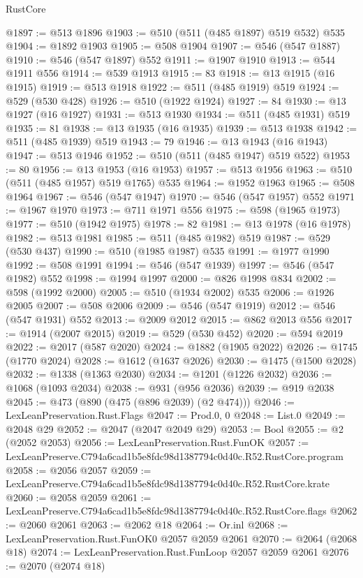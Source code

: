 \begin{lexlean}{RustCore}
\begin{coremodule}
@1897 := @513 @1896
@1903 := @510 (@511 (@485 @1897) @519 @532) @535
@1904 := @1892 @1903
@1905 := @508 @1904
@1907 := @546 (@547 @1887)
@1910 := @546 (@547 @1897) @552
@1911 := @1907 @1910
@1913 := @544 @1911 @556
@1914 := @539 @1913
@1915 := 83
@1918 := @13 @1915 (@16 @1915)
@1919 := @513 @1918
@1922 := @511 (@485 @1919) @519
@1924 := @529 (@530 @428)
@1926 := @510 (@1922 @1924)
@1927 := 84
@1930 := @13 @1927 (@16 @1927)
@1931 := @513 @1930
@1934 := @511 (@485 @1931) @519
@1935 := 81
@1938 := @13 @1935 (@16 @1935)
@1939 := @513 @1938
@1942 := @511 (@485 @1939) @519
@1943 := 79
@1946 := @13 @1943 (@16 @1943)
@1947 := @513 @1946
@1952 := @510 (@511 (@485 @1947) @519 @522)
@1953 := 80
@1956 := @13 @1953 (@16 @1953)
@1957 := @513 @1956
@1963 := @510 (@511 (@485 @1957) @519 @1765) @535
@1964 := @1952 @1963
@1965 := @508 @1964
@1967 := @546 (@547 @1947)
@1970 := @546 (@547 @1957) @552
@1971 := @1967 @1970
@1973 := @711 @1971 @556
@1975 := @598 (@1965 @1973)
@1977 := @510 (@1942 @1975)
@1978 := 82
@1981 := @13 @1978 (@16 @1978)
@1982 := @513 @1981
@1985 := @511 (@485 @1982) @519
@1987 := @529 (@530 @437)
@1990 := @510 (@1985 @1987) @535
@1991 := @1977 @1990
@1992 := @508 @1991
@1994 := @546 (@547 @1939)
@1997 := @546 (@547 @1982) @552
@1998 := @1994 @1997
@2000 := @826 @1998 @834
@2002 := @598 (@1992 @2000)
@2005 := @510 (@1934 @2002) @535
@2006 := @1926 @2005
@2007 := @508 @2006
@2009 := @546 (@547 @1919)
@2012 := @546 (@547 @1931) @552
@2013 := @2009 @2012
@2015 := @862 @2013 @556
@2017 := @1914 (@2007 @2015)
@2019 := @529 (@530 @452)
@2020 := @594 @2019
@2022 := @2017 (@587 @2020)
@2024 := @1882 (@1905 @2022)
@2026 := @1745 (@1770 @2024)
@2028 := @1612 (@1637 @2026)
@2030 := @1475 (@1500 @2028)
@2032 := @1338 (@1363 @2030)
@2034 := @1201 (@1226 @2032)
@2036 := @1068 (@1093 @2034)
@2038 := @931 (@956 @2036)
@2039 := @919 @2038
@2045 := @473 (@890 (@475 (@896 @2039) (@2 @474)))
@2046 := LexLeanPreservation.Rust.Flags
@2047 := Prod.{0, 0}
@2048 := List.{0}
@2049 := @2048 @29
@2052 := @2047 (@2047 @2049 @29)
@2053 := Bool
@2055 := @2 (@2052 @2053)
@2056 := LexLeanPreservation.Rust.FunOK
@2057 := LexLeanPreserve.C794a6cad1b5e8fdc98d1387794c0d40c.R52.RustCore.program
@2058 := @2056 @2057
@2059 := LexLeanPreserve.C794a6cad1b5e8fdc98d1387794c0d40c.R52.RustCore.krate
@2060 := @2058 @2059
@2061 := LexLeanPreserve.C794a6cad1b5e8fdc98d1387794c0d40c.R52.RustCore.flags
@2062 := @2060 @2061
@2063 := @2062 @18
@2064 := Or.inl
@2068 := LexLeanPreservation.Rust.FunOK0 @2057 @2059 @2061
@2070 := @2064 (@2068 @18)
@2074 := LexLeanPreservation.Rust.FunLoop @2057 @2059 @2061
@2076 := @2070 (@2074 @18)

\end{coremodule}
\end{lexlean}
